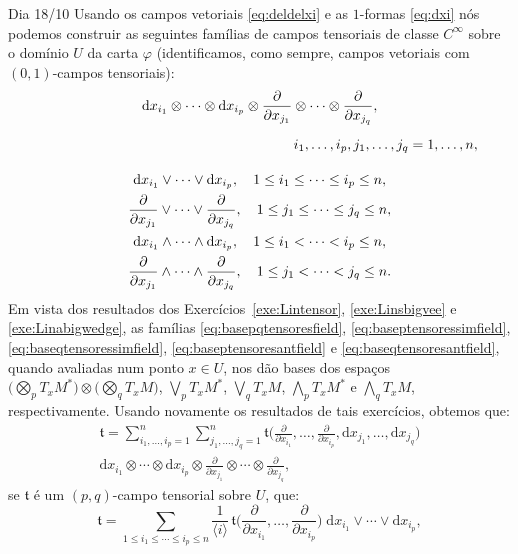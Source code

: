 \documentclass[oneside,11pt]{amsart}
\newcommand{\dd}{\mathrm d}
\theoremstyle{remark}\newtheorem{exercise}{Exercício}[section]
\theoremstyle{plain}\newtheorem{teo}{Teorema}[section]
\theoremstyle{plain}\newtheorem{lem}[teo]{Lema}
\theoremstyle{plain}\newtheorem{prop}[teo]{Proposição}
\theoremstyle{definition}\newtheorem{defin}[teo]{Definição}
\theoremstyle{remark}\newtheorem{rem}[teo]{Observação}
\theoremstyle{definition}\newtheorem{example}[teo]{Exemplo}
\numberwithin{equation}{section}
\begin{document}
\begin{section}{Dia 18/10}
Usando os campos vetoriais \eqref{eq:deldelxi} e as $1$-formas \eqref{eq:dxi} nós podemos construir as seguintes famílias de campos tensoriais de classe $C^\infty$ sobre o domínio $U$ da
carta $\varphi$ (identificamos, como sempre, campos vetoriais com $(0,1)$-campos tensoriais):
\begin{gather}
\label{eq:basepqtensoresfield}
\dd x_{i_1}\otimes\cdots\otimes\dd x_{i_p}\otimes\frac{\partial}{\partial x_{j_1}}\otimes\cdots\otimes\frac{\partial}{\partial x_{j_q}},\\[5pt]
\notag\qquad\qquad\qquad\qquad\qquad\qquad\qquad\qquad\qquad i_1,\ldots,i_p,j_1,\ldots,j_q=1,\ldots,n,\\[10pt]
\label{eq:baseptensoressimfield}
\dd x_{i_1}\vee\cdots\vee\dd x_{i_p},\quad 1\le i_1\le\cdots\le i_p\le n,\\
\label{eq:baseqtensoressimfield}
\frac{\partial}{\partial x_{j_1}}\vee\cdots\vee\frac{\partial}{\partial x_{j_q}},\quad 1\le j_1\le\cdots\le j_q\le n,\\
\label{eq:baseptensoresantfield}
\dd x_{i_1}\wedge\cdots\wedge\dd x_{i_p},\quad 1\le i_1<\cdots<i_p\le n,\\
\label{eq:baseqtensoresantfield}
\frac{\partial}{\partial x_{j_1}}\wedge\cdots\wedge\frac{\partial}{\partial x_{j_q}},\quad 1\le j_1<\cdots<j_q\le n.
\end{gather}
Em vista dos resultados dos Exercícios~\ref{exe:Lintensor}, \ref{exe:Linsbigvee} e \ref{exe:Linabigwedge}, as
famílias \eqref{eq:basepqtensoresfield}, \eqref{eq:baseptensoressimfield}, \eqref{eq:baseqtensoressimfield}, \eqref{eq:baseptensoresantfield}
e \eqref{eq:baseqtensoresantfield}, quando avaliadas num ponto $x\in U$, nos dão bases dos espaços $\big(\bigotimes_pT_xM^*\big)\otimes\big(\bigotimes_qT_xM\big)$,
$\bigvee_pT_xM^*$, $\bigvee_qT_xM$, $\bigwedge_pT_xM^*$ e $\bigwedge_qT_xM$, respectivamente. Usando novamente os resultados de tais e\-xer\-cí\-cios, obtemos que:
\begin{multline*}
\mathfrak t=\sum_{i_1,\ldots,i_p=1}^n\sum_{j_1,\ldots,j_q=1}^n\mathfrak t\Big(\frac{\partial}{\partial x_{i_1}},\ldots,
\frac{\partial}{\partial x_{i_p}},\dd x_{j_1},\ldots,\dd x_{j_q}\Big)\\
\dd x_{i_1}\otimes\cdots\otimes\dd x_{i_p}\otimes\frac{\partial}{\partial x_{j_1}}
\otimes\cdots\otimes\frac{\partial}{\partial x_{j_q}},
\end{multline*}
se $\mathfrak t$ é um $(p,q)$-campo tensorial sobre $U$, que:
\[\mathfrak t=\sum_{1\le i_1\le\cdots\le i_p\le n}
\frac1{\langle i\rangle}\,\mathfrak t\Big(\frac{\partial}{\partial x_{i_1}},\ldots,\frac{\partial}{\partial x_{i_p}}\Big)\;\dd x_{i_1}\vee\cdots\vee\dd x_{i_p},\]

\end{section}
\end{document}
